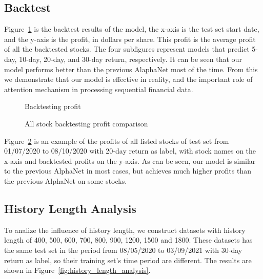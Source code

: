 \documentclass{article}
\begin{document}
\subsection{Backtest}
\hspace{16}Figure~\ref{fig:btp} is the backtest results of the model, the x-axis is the test set start date, and the y-axis is the profit, in dollars per share. This profit is the average profit of all the backtested stocks. The four subfigures represent models that predict 5-day, 10-day, 20-day, and 30-day return, respectively. It can be seen that our model performs better than the previous AlaphaNet most of the time. From this we demonstrate that our model is effective in reality, and the important role of attention mechanism in processing sequential financial data.
\begin{figure}[htbp]
    \caption{Backtesting profit}
    \label{fig:btp}
\end{figure}
\begin{figure}[htbp]
    \caption{All stock backtesting profit comparison }
    \label{fig:bpd}
\end{figure}

\hspace{16}Figure~\ref{fig:bpd} is an example of the profits of all listed stocks of test set from 01/07/2020 to 08/10/2020 with 20-day return as label, with stock names on the x-axis and backtested profits on the y-axis. As can be seen, our model is similar to the previous AlphaNet in most cases, but achieves much higher profits than the previous AlphaNet on some stocks.

\subsection{History Length Analysis}
\hspace{16}To analize the influence of history length, we construct datasets with history length of 400, 500, 600, 700, 800, 900, 1200, 1500 and 1800. These datasets has the same test set in the period from 08/05/2020 to 03/09/2021 with 30-day return as label, so their training set's time period are different. The results are shown in Figure~\ref{fig:history_length_analysis}.
\end{document}
